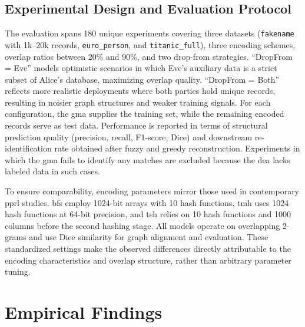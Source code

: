 \documentclass[a4paper,11pt]{scrartcl}
\begin{document}
\subsection{Experimental Design and Evaluation Protocol}
The evaluation spans 180 unique experiments covering three datasets (\texttt{fakename} with 1k--20k records, \texttt{euro\_person}, and \texttt{titanic\_full}), three encoding schemes, overlap ratios between 20\% and 90\%, and two drop-from strategies. ``DropFrom = Eve'' models optimistic scenarios in which Eve's auxiliary data is a strict subset of Alice's database, maximizing overlap quality. ``DropFrom = Both'' reflects more realistic deployments where both parties hold unique records, resulting in noisier graph structures and weaker training signals. For each configuration, the \ac{gma} supplies the training set, while the remaining encoded records serve as test data. Performance is reported in terms of structural prediction quality (precision, recall, F1-score, Dice) and downstream re-identification rate obtained after fuzzy and greedy reconstruction. Experiments in which the \ac{gma} fails to identify any matches are excluded because the \ac{dea} lacks labeled data in such cases.

To ensure comparability, encoding parameters mirror those used in contemporary \ac{pprl} studies. \ac{bf}s employ 1024-bit arrays with 10 hash functions, \ac{tmh} uses 1024 hash functions at 64-bit precision, and \ac{tsh} relies on 10 hash functions and 1000 columns before the second hashing stage. All models operate on overlapping 2-grams and use Dice similarity for graph alignment and evaluation. These standardized settings make the observed differences directly attributable to the encoding characteristics and overlap structure, rather than arbitrary parameter tuning.

\section{Empirical Findings}
\end{document}

